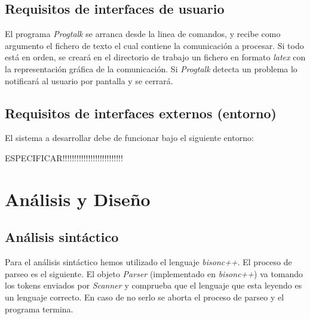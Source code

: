 \documentclass[12pt,a4paper]{report}
\begin{document}
\section{Requisitos de interfaces de usuario}

El programa \textit{Progtalk} se arranca desde la linea de comandos, y recibe como argumento el fichero de texto el cual contiene la comunicación a procesar. Si todo está en orden, se creará en el directorio de trabajo un fichero en formato \textit{latex} con la representación gráfica de la comunicación. Si \textit{Progtalk} detecta un problema lo notificará al usuario por pantalla y se cerrará.

\section{Requisitos de interfaces externos (entorno)}

El sistema a desarrollar debe de funcionar bajo el siguiente entorno:

ESPECIFICAR!!!!!!!!!!!!!!!!!!!!!!!!!!

\chapter{Análisis y Diseño}

\section{Análisis sintáctico}

Para el análisis sintáctico hemos utilizado el lenguaje \textit{bisonc++}. El proceso de parseo es el siguiente. El objeto \textit{Parser} (implementado en \textit{bisonc++}) va tomando los tokens enviados por \textit{Scanner} y comprueba que el lenguaje que esta leyendo es un lenguaje correcto. En caso de no serlo se aborta el proceso de parseo y el programa termina.
\end{document}
